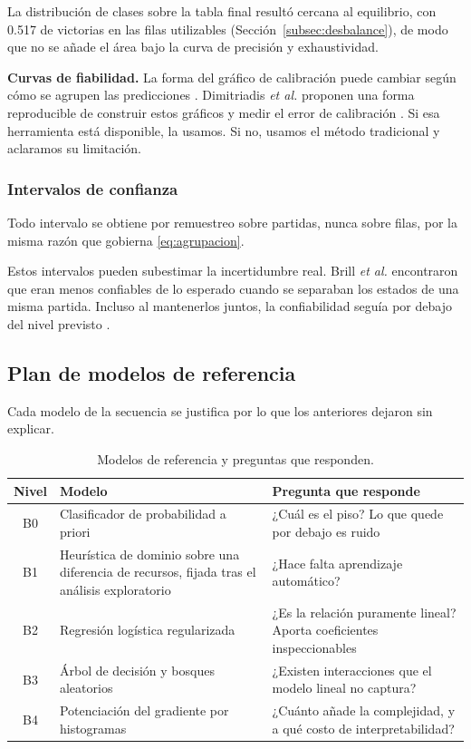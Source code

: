 La distribución de clases sobre la tabla final resultó cercana al
equilibrio, con 0.517 de victorias en las filas utilizables
(Sección~\ref{subsec:desbalance}), de modo que no se añade el área bajo la
curva de precisión y exhaustividad.

\noindent\textbf{Curvas de fiabilidad.} La forma del gráfico de
calibración puede cambiar según cómo se agrupen las predicciones
\cite{silvafilho_calibration_2023}. Dimitriadis \textit{et al.} proponen
una forma reproducible de construir estos gráficos y medir el error de
calibración \cite{dimitriadis_reliability_2021}. Si esa herramienta está
disponible, la usamos. Si no, usamos el método tradicional y aclaramos su
limitación.

\subsubsection{Intervalos de confianza}

Todo intervalo se obtiene por remuestreo sobre partidas, nunca sobre filas,
por la misma razón que gobierna \eqref{eq:agrupacion}.

Estos intervalos pueden subestimar la incertidumbre real. Brill \textit{et al.}
encontraron que eran menos confiables de lo esperado cuando se separaban los
estados de una misma partida. Incluso al mantenerlos juntos, la confiabilidad
seguía por debajo del nivel previsto \cite{brill_winprob_2026}.

\subsection{Plan de modelos de referencia}
\label{subsec:planbaselines}

Cada modelo de la secuencia se justifica por lo que los anteriores dejaron
sin explicar.

\begin{table}[!t]
\centering
\caption{Modelos de referencia y preguntas que responden.}
\label{tab:baselines}
\footnotesize
\begin{tabularx}{\columnwidth}{@{}c P{2.1cm} Y@{}}
\toprule
\textbf{Nivel} & \textbf{Modelo} & \textbf{Pregunta que responde}\\
\midrule
B0 & Clasificador de probabilidad a priori & ¿Cuál es el piso? Lo que quede
por debajo es ruido\\
B1 & Heurística de dominio sobre una diferencia de recursos, fijada tras el
análisis exploratorio & ¿Hace falta aprendizaje automático?\\
B2 & Regresión logística regularizada & ¿Es la relación puramente
lineal? Aporta coeficientes inspeccionables\\
B3 & Árbol de decisión y bosques aleatorios & ¿Existen interacciones que el
modelo lineal no captura?\\
B4 & Potenciación del gradiente por histogramas & ¿Cuánto añade la
complejidad, y a qué costo de interpretabilidad?\\
\bottomrule
\end{tabularx}
\end{table}

